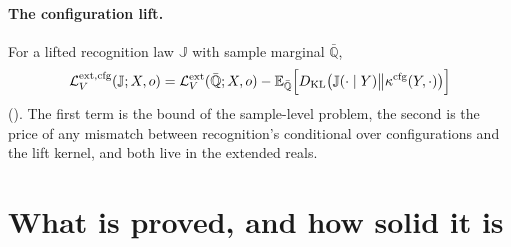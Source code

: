 \paragraph{The configuration lift.}
For a lifted recognition law $\mathbb J$ with sample marginal $\bar{\mathbb Q}$,
\[
\mathcal L^{\mathrm{ext,cfg}}_V(\mathbb J;X,o)
=\mathcal L^{\mathrm{ext}}_V(\bar{\mathbb Q};X,o)
-\mathbb E_{\bar{\mathbb Q}}\Bigl[D_{\mathrm{KL}}\bigl(\mathbb J(\cdot\mid Y)\big\Vert\kappa^{\mathrm{cfg}}(Y,\cdot)\bigr)\Bigr]
\]
(). The first term is the bound of the sample-level problem, the second
is the price of any mismatch between recognition's conditional over configurations and the lift kernel, and both
live in the extended reals.

\section{What is proved, and how solid it is}
\label{comp:ch03-status}

